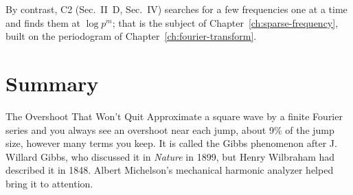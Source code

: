 By contrast, C2 (Sec.~II~D, Sec.~IV) searches for a few frequencies one at a time and finds them at $\log p^m$; that is the subject of Chapter~\ref{ch:sparse-frequency}, built on the periodogram of Chapter~\ref{ch:fourier-transform}.

\section{Summary}\label{sec:fourier-series-summary}
\begin{didyouknow}{The Overshoot That Won't Quit}
Approximate a square wave by a finite Fourier series and you always see an overshoot near each jump, about 9\% of the jump size, however many terms you keep. It is called the Gibbs phenomenon after J. Willard Gibbs, who discussed it in \emph{Nature} in 1899, but Henry Wilbraham had described it in 1848. Albert Michelson's mechanical harmonic analyzer helped bring it to attention.
\end{didyouknow}

